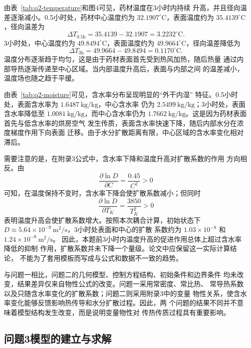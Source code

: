 \documentclass[12pt,a4paper]{article}
\begin{document}
由表~\ref{tab:q2-temperature}和图4可见，药材温度在3小时内持续
升高，并且径向温差逐渐减小。0.5小时处，药材中心温度约为
$32.1907^\circ\mathrm{C}$，表面温度约为
$35.4139^\circ\mathrm{C}$，径向温差为
\begin{equation}
\Delta T_{0.5\mathrm h}
=
35.4139-32.1907
=
3.2232^\circ\mathrm{C}.
\end{equation}
3小时处，中心温度约为 $49.8494^\circ\mathrm{C}$，表面温度约为
$49.9664^\circ\mathrm{C}$，径向温差降低为
\begin{equation}
\Delta T_{3\mathrm h}
=
49.9664-49.8494
=
0.1170^\circ\mathrm{C}.
\end{equation}
温度分布逐渐趋于均匀，这是由于药材表面首先受到热风加热，随后热量
通过内部导热逐渐传递至中心区域。当内部温度升高后，表面与内部之间
的温差减小，温度场也随之趋于平缓。

由表~\ref{tab:q2-moisture}可见，含水率分布呈现明显的“外干内湿”
特征。0.5小时处，表面含水率为 $1.6487\ \mathrm{kg/kg}$，中心含水率
仍为 $2.5499\ \mathrm{kg/kg}$；3小时处，表面含水率降低至
$1.0081\ \mathrm{kg/kg}$，而中心含水率仍为
$1.7662\ \mathrm{kg/kg}$。这是因为药材表面首先与低含水率的烘房空气
发生传质，表面含水率快速下降，随后内部水分在浓度梯度作用下向表面
迁移。由于水分扩散距离有限，中心区域的含水率变化相对滞后。

需要注意的是，在附录3公式中，含水率下降和温度升高对扩散系数的作用
方向相反。由
\begin{equation}
\frac{\partial\ln D}{\partial C}
=
\frac{0.45}{C^2}>0
\end{equation}
可知，在温度保持不变时，含水率下降会使扩散系数减小；但同时
\begin{equation}
\frac{\partial\ln D}{\partial T_K}
=
\frac{3850}{T_K^2}>0
\end{equation}
表明温度升高会使扩散系数增大。按照本次耦合计算，初始状态下
$D\approx5.64\times10^{-9}\ \mathrm{m^2/s}$，3小时处表面和中心的扩散
系数约为 $1.03\times10^{-8}$ 和 $1.24\times10^{-8}\ \mathrm{m^2/s}$。
因此，本题前3小时内温度升高的促进作用总体上超过含水率降低的抑制
作用，扩散系数并未下降一个量级。论文中应保留这一实际计算结论，
不能为了套用模板而写成与公式和数据不一致的趋势。

与问题一相比，问题二的几何模型、控制方程结构、初始条件和边界条件
均未改变，结果差异仅来自物性公式的改变。问题一采用常密度、常比热、
常导热系数以及只随含水率变化的扩散系数；问题二则采用附录3中的变量
物性关系，使含水率变化能够反馈影响热传导和水分扩散过程。因此，两
个问题的结果不同并不意味着模型结构发生改变，而是说明变量物性对
传热传质过程具有重要影响。
\subsection{问题3模型的建立与求解}
\end{document}
